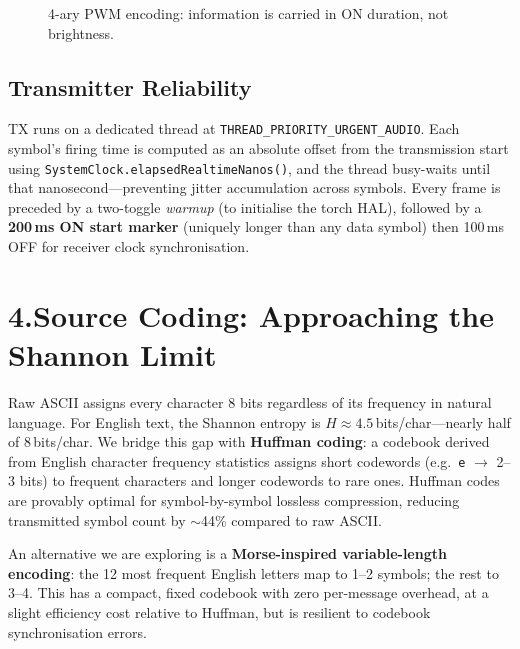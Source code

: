 \documentclass[10pt,a4paper]{article}
\begin{document}
\begin{figure}[h]
\begin{subfigure}[t]{0.58\linewidth}
\label{fig:waveform}
\end{subfigure}
\caption{4-ary PWM encoding: information is carried in ON duration, not brightness.}
\label{fig:pwm}
\end{figure}

\subsection{Transmitter Reliability}
TX runs on a dedicated thread at \texttt{THREAD\_PRIORITY\_URGENT\_AUDIO}.
Each symbol's firing time is computed as an absolute offset from the transmission start
using \texttt{SystemClock.elapsedRealtimeNanos()}, and the thread busy-waits until that
nanosecond---preventing jitter accumulation across symbols.
Every frame is preceded by a two-toggle \emph{warmup} (to initialise the torch HAL),
followed by a \textbf{200\,ms ON start marker} (uniquely longer than any data symbol)
then 100\,ms OFF for receiver clock synchronisation.

\section{4.\enspace Source Coding: Approaching the Shannon Limit}

Raw ASCII assigns every character 8 bits regardless of its frequency in natural language.
For English text, the Shannon entropy is $H \approx 4.5$\,bits/char---nearly half of 8\,bits/char.
We bridge this gap with \textbf{Huffman coding}: a codebook derived from English character
frequency statistics assigns short codewords (e.g.\ \texttt{e} $\to$ 2--3 bits) to frequent
characters and longer codewords to rare ones.
Huffman codes are provably optimal for symbol-by-symbol lossless compression, reducing
transmitted symbol count by $\sim$44\% compared to raw ASCII.

An alternative we are exploring is a \textbf{Morse-inspired variable-length encoding}:
the 12 most frequent English letters map to 1--2 symbols; the rest to 3--4.
This has a compact, fixed codebook with zero per-message overhead, at a slight efficiency
cost relative to Huffman, but is resilient to codebook synchronisation errors.
\end{document}
